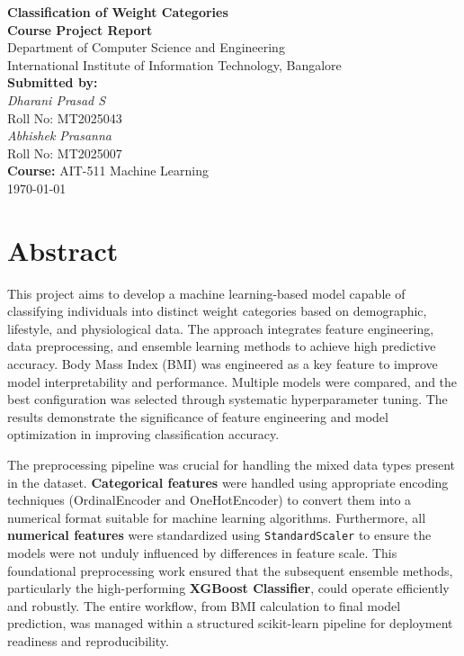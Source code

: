 \documentclass[12pt,a4paper]{report}
\begin{document}
\begin{titlepage}
    \centering
    \vspace*{2cm}
    {\LARGE \textbf{Classification of Weight Categories}}\\[1.5cm]
    {\large \textbf{Course Project Report}}\\[0.5cm]
    {\large Department of Computer Science and Engineering}\\[0.2cm]
    {\large International Institute of Information Technology, Bangalore}\\[0.5cm]
    \vfill
    \textbf{Submitted by:}\\
    \textit{Dharani Prasad S}\\
    Roll No: MT2025043\\[0.2cm]
    \textit{Abhishek Prasanna}\\
    Roll No: MT2025007\\[0.2cm]
    
    \vfill
    \textbf{Course:} AIT-511 Machine Learning\\
    \vfill
    {\large \today}
\end{titlepage}

\tableofcontents
\newpage

\chapter{Abstract}
This project aims to develop a machine learning-based model capable of classifying individuals into distinct weight categories based on demographic, lifestyle, and physiological data. The approach integrates feature engineering, data preprocessing, and ensemble learning methods to achieve high predictive accuracy. Body Mass Index (BMI) was engineered as a key feature to improve model interpretability and performance. Multiple models were compared, and the best configuration was selected through systematic hyperparameter tuning. The results demonstrate the significance of feature engineering and model optimization in improving classification accuracy.

The preprocessing pipeline was crucial for handling the mixed data types present in the dataset. \textbf{Categorical features} were handled using appropriate encoding techniques (OrdinalEncoder and OneHotEncoder) to convert them into a numerical format suitable for machine learning algorithms. Furthermore, all \textbf{numerical features} were standardized using \verb|StandardScaler| to ensure the models were not unduly influenced by differences in feature scale. This foundational preprocessing work ensured that the subsequent ensemble methods, particularly the high-performing \textbf{XGBoost Classifier}, could operate efficiently and robustly. The entire workflow, from BMI calculation to final model prediction, was managed within a structured scikit-learn pipeline for deployment readiness and reproducibility.
\end{document}

